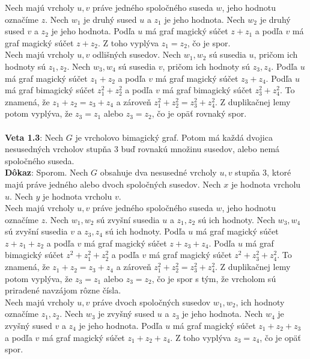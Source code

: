 \documentclass[12pt]{article}
\begin{document}
Nech majú vrcholy $u,v$ práve jedného spoločného suseda $w$, jeho hodnotu označíme $z$. Nech $w_1$ je druhý sused $u$ a $z_1$ je jeho hodnota. Nech $w_2$ je druhý sused $v$ a $z_2$ je jeho hodnota. Podľa $u$ má graf magický súčet $z + z_1$ a podľa $v$ má graf magický súčet $z + z_2$. Z toho vyplýva $z_1 = z_2$, čo je spor. \\

Nech majú vrcholy $u,v$ odlišných susedov. Nech $w_1, w_2$ sú susedia $u$, pričom ich hodnoty sú $z_1, z_2$. Nech $w_3, w_4$ sú susedia $v$, pričom ich hodnoty sú $z_3, z_4$. Podľa $u$ má graf magický súčet $z_1 + z_2$ a podľa $v$ má graf magický súčet $z_3 + z_4$. Podľa $u$ má graf bimagický súčet $z^2_1 + z^2_2$ a podľa $v$ má graf bimagický súčet $z^2_3 + z^2_4$. To znamená, že $z_1 + z_2 = z_3 + z_4$ a zároveň $z^2_1 + z^2_2 = z^2_3 + z^2_4$. Z duplikačnej lemy potom vyplýva, že $z_3 = z_1$ alebo $z_3 = z_2$, čo je opäť rovnaký spor. \\\\

\textbf{Veta 1.3}: Nech $G$ je vrcholovo bimagický graf. Potom má každá dvojica nesusedných vrcholov stupňa 3 buď rovnakú množinu susedov, alebo nemá spoločného suseda.  \\

\textbf{Dôkaz}: Sporom. Nech $G$ obsahuje dva nesusedné vrcholy $u,v$ stupňa 3, ktoré majú práve jedného alebo dvoch spoločných susedov. Nech $x$ je hodnota vrcholu $u$. Nech $y$ je hodnota vrcholu $v$.  \\

Nech majú vrcholy $u,v$ práve jedného spoločného suseda $w$, jeho hodnotu označíme $z$. Nech $w_1, w_2$ sú zvyšní susedia $u$ a $z_1, z_2$ sú ich hodnoty. Nech $w_3, w_4$ sú zvyšní susedia $v$ a $z_3, z_4$ sú ich hodnoty. Podľa $u$ má graf magický súčet $z + z_1 + z_2$ a podľa $v$ má graf magický súčet $z + z_3 + z_4$. Podľa $u$ má graf bimagický súčet $z^2 + z^2_1 + z^2_2$ a podľa $v$ má graf magický súčet $z^2 + z^2_3 + z^2_4$. To znamená, že $z_1 + z_2 = z_3 + z_4$ a zároveň $z^2_1 + z^2_2 = z^2_3 + z^2_4$. Z duplikačnej lemy potom vyplýva, že $z_3 = z_1$ alebo $z_3 = z_2$, čo je spor s tým, že vrcholom sú priradené navzájom rôzne čísla. \\

Nech majú vrcholy $u,v$ práve dvoch spoločných susedov $w_1, w_2$, ich hodnoty označíme $z_1, z_2$. Nech $w_3$ je zvyšný sused $u$ a $z_3$ je jeho hodnota. Nech $w_4$ je zvyšný sused $v$ a $z_4$ je jeho hodnota. Podľa $u$ má graf magický súčet $z_1 + z_2 + z_3$ a podľa $v$ má graf magický súčet $z_1 + z_2 + z_4$. Z toho vyplýva $z_3 = z_4$, čo je opäť spor. \\\\
\end{document}
